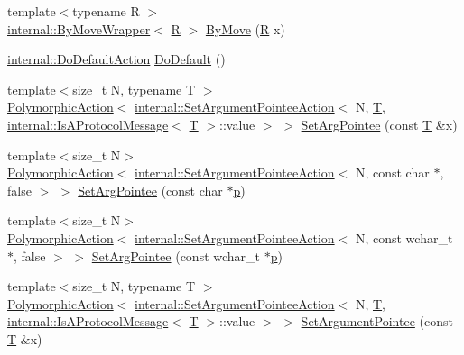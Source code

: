 \begin{DoxyCompactItemize}
\item 
{\footnotesize template$<$typename R $>$ }\\\hyperlink{structtesting_1_1internal_1_1_by_move_wrapper}{internal\+::\+By\+Move\+Wrapper}$<$ \hyperlink{typedefs__9_8js_afb423b73ee7b6c04d2d54fc06e405404}{R} $>$ \hyperlink{namespacetesting_acaa432211a3aec62e3d0f24b47bd2dae}{By\+Move} (\hyperlink{typedefs__9_8js_afb423b73ee7b6c04d2d54fc06e405404}{R} x)
\item 
\hyperlink{classtesting_1_1internal_1_1_do_default_action}{internal\+::\+Do\+Default\+Action} \hyperlink{namespacetesting_ae041df61ff61ccb9753ba15b4309e1a6}{Do\+Default} ()
\item 
{\footnotesize template$<$size\+\_\+t N, typename T $>$ }\\\hyperlink{classtesting_1_1_polymorphic_action}{Polymorphic\+Action}$<$ \hyperlink{classtesting_1_1internal_1_1_set_argument_pointee_action}{internal\+::\+Set\+Argument\+Pointee\+Action}$<$ N, \hyperlink{functions__7_8js_adf1f3edb9115acb0a1e04209b7a9937b}{T}, \hyperlink{structtesting_1_1internal_1_1_is_a_protocol_message}{internal\+::\+Is\+A\+Protocol\+Message}$<$ \hyperlink{functions__7_8js_adf1f3edb9115acb0a1e04209b7a9937b}{T} $>$\+::value $>$ $>$ \hyperlink{namespacetesting_a5740a5033b88c37666fcd09a269d123f}{Set\+Arg\+Pointee} (const \hyperlink{functions__7_8js_adf1f3edb9115acb0a1e04209b7a9937b}{T} \&x)
\item 
{\footnotesize template$<$size\+\_\+t N$>$ }\\\hyperlink{classtesting_1_1_polymorphic_action}{Polymorphic\+Action}$<$ \hyperlink{classtesting_1_1internal_1_1_set_argument_pointee_action}{internal\+::\+Set\+Argument\+Pointee\+Action}$<$ N, const char $\ast$, false $>$ $>$ \hyperlink{namespacetesting_a4a190fd2d02fb7cd79c5b3df3f80b647}{Set\+Arg\+Pointee} (const char $\ast$\hyperlink{jquery_8js_a2335e57f79b6acfb6de59c235dc8a83e}{p})
\item 
{\footnotesize template$<$size\+\_\+t N$>$ }\\\hyperlink{classtesting_1_1_polymorphic_action}{Polymorphic\+Action}$<$ \hyperlink{classtesting_1_1internal_1_1_set_argument_pointee_action}{internal\+::\+Set\+Argument\+Pointee\+Action}$<$ N, const wchar\+\_\+t $\ast$, false $>$ $>$ \hyperlink{namespacetesting_ac128085b4a8d64563fd5ccef324ea177}{Set\+Arg\+Pointee} (const wchar\+\_\+t $\ast$\hyperlink{jquery_8js_a2335e57f79b6acfb6de59c235dc8a83e}{p})
\item 
{\footnotesize template$<$size\+\_\+t N, typename T $>$ }\\\hyperlink{classtesting_1_1_polymorphic_action}{Polymorphic\+Action}$<$ \hyperlink{classtesting_1_1internal_1_1_set_argument_pointee_action}{internal\+::\+Set\+Argument\+Pointee\+Action}$<$ N, \hyperlink{functions__7_8js_adf1f3edb9115acb0a1e04209b7a9937b}{T}, \hyperlink{structtesting_1_1internal_1_1_is_a_protocol_message}{internal\+::\+Is\+A\+Protocol\+Message}$<$ \hyperlink{functions__7_8js_adf1f3edb9115acb0a1e04209b7a9937b}{T} $>$\+::value $>$ $>$ \hyperlink{namespacetesting_a03b315d27c91a8e719f2b6c09964130b}{Set\+Argument\+Pointee} (const \hyperlink{functions__7_8js_adf1f3edb9115acb0a1e04209b7a9937b}{T} \&x)

\end{DoxyCompactItemize}
